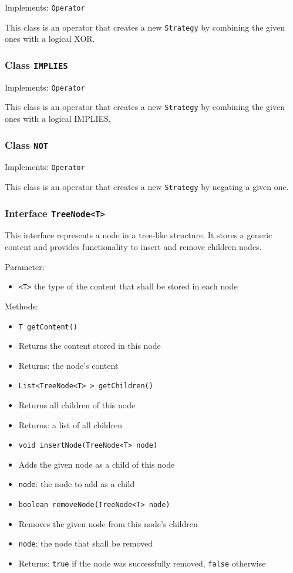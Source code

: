 \documentclass[parskip=full,11pt]{scrartcl}
\begin{document}
Implements: \texttt{Operator}

This class is an operator that creates a new \texttt{Strategy} by combining the given ones with a logical \textsf{XOR}.

\subsubsection{Class \texttt{IMPLIES}}

Implements: \texttt{Operator}

This class is an operator that creates a new \texttt{Strategy} by combining the given ones with a logical \textsf{IMPLIES}.

\subsubsection{Class \texttt{NOT}}

Implements: \texttt{Operator}

This class is an operator that creates a new \texttt{Strategy} by negating a given one.

\subsubsection{Interface \texttt{TreeNode<T>}}

This interface represents a node in a tree-like structure. It stores a generic content and provides functionality to insert and remove children nodes.

Parameter:
\begin{itemize}\itemsep -10pt
	\item \texttt{<T>} the type of the content that shall be stored in each node
\end{itemize}

Methods:
\begin{itemize}\itemsep -10pt
	\item \texttt{T getContent()}
	\item[] Returns the content stored in this node
	\item[] Returns: the node's content

	\item \texttt{List<TreeNode<T>\,> getChildren()}
	\item[] Returns all children of this node
	\item[] Returns: a list of all children

	\item \texttt{void insertNode(TreeNode<T> node)}
	\item[] Adds the given node as a child of this node
	\item[] \texttt{node}: the node to add as a child

	\item \texttt{boolean removeNode(TreeNode<T> node)}
	\item[] Removes the given node from this node's children
	\item[] \texttt{node}: the node that shall be removed
	\item[] Returns: \texttt{true} if the node was successfully removed, \texttt{false} otherwise
\end{itemize}
\end{document}

